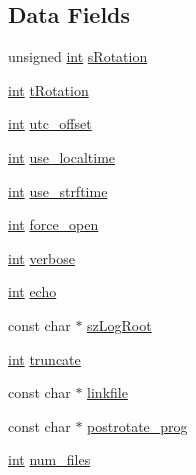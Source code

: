 \subsection*{Data Fields}
\begin{DoxyCompactItemize}
\item 
unsigned \hyperlink{pcre_8txt_a42dfa4ff673c82d8efe7144098fbc198}{int} \hyperlink{structrotate__config_a4b2682d892163fe2440610dcc69fa7d8}{s\+Rotation}
\item 
\hyperlink{pcre_8txt_a42dfa4ff673c82d8efe7144098fbc198}{int} \hyperlink{structrotate__config_a76f48c552987ee8a649982e64d5e1aa7}{t\+Rotation}
\item 
\hyperlink{pcre_8txt_a42dfa4ff673c82d8efe7144098fbc198}{int} \hyperlink{structrotate__config_a52ab8b2e09ddd9c9dfe2f5bc22e870ee}{utc\+\_\+offset}
\item 
\hyperlink{pcre_8txt_a42dfa4ff673c82d8efe7144098fbc198}{int} \hyperlink{structrotate__config_a0a19006aff1fd73c76ba9afe93323b47}{use\+\_\+localtime}
\item 
\hyperlink{pcre_8txt_a42dfa4ff673c82d8efe7144098fbc198}{int} \hyperlink{structrotate__config_aa722a6560c1e0a5f1056be971d28be6e}{use\+\_\+strftime}
\item 
\hyperlink{pcre_8txt_a42dfa4ff673c82d8efe7144098fbc198}{int} \hyperlink{structrotate__config_a8917a50032c1706f3c4688072b9ca7c6}{force\+\_\+open}
\item 
\hyperlink{pcre_8txt_a42dfa4ff673c82d8efe7144098fbc198}{int} \hyperlink{structrotate__config_a91abcd272d57fd42a78cf5ee99c15e14}{verbose}
\item 
\hyperlink{pcre_8txt_a42dfa4ff673c82d8efe7144098fbc198}{int} \hyperlink{structrotate__config_adf35b051fdd7caa43b30057135508cbe}{echo}
\item 
const char $\ast$ \hyperlink{structrotate__config_a5605c25dfeaa6c4a9ba8766d5db639c4}{sz\+Log\+Root}
\item 
\hyperlink{pcre_8txt_a42dfa4ff673c82d8efe7144098fbc198}{int} \hyperlink{structrotate__config_a77ccfd07abe0af48f187499eb465c6be}{truncate}
\item 
const char $\ast$ \hyperlink{structrotate__config_a6c095c2a2061e2ff5f7b15e287728663}{linkfile}
\item 
const char $\ast$ \hyperlink{structrotate__config_af08f44aa9d58b9644e44b6ca394dfb85}{postrotate\+\_\+prog}
\item 
\hyperlink{pcre_8txt_a42dfa4ff673c82d8efe7144098fbc198}{int} \hyperlink{structrotate__config_a7da88ff2062be9efa6e12e49d9a7a7aa}{num\+\_\+files}
\end{DoxyCompactItemize}


